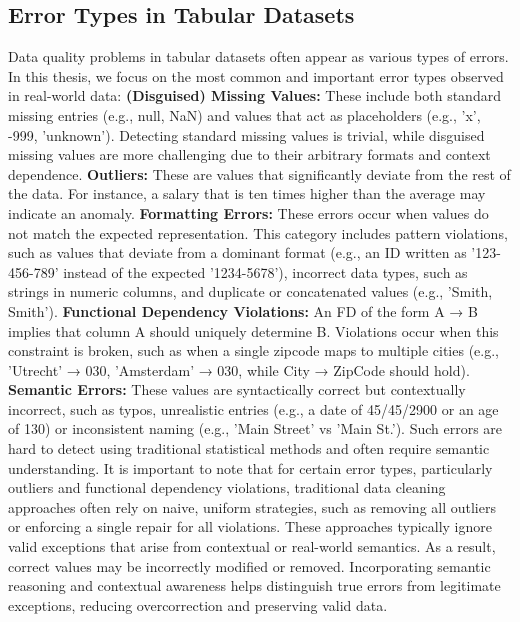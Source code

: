 \subsection{Error Types in Tabular Datasets}
Data quality problems in tabular datasets often appear as various types of errors. 
In this thesis, we focus on the most common and important error types observed in real-world data:
\newline\newline
\textbf{(Disguised) Missing Values:} These include both standard missing entries (e.g., null, NaN) and values that act as placeholders (e.g., 'x', -999, 'unknown'). 
Detecting standard missing values is trivial, while disguised missing values are more challenging due to their arbitrary formats and context dependence. 
\newline
\textbf{Outliers:} These are values that significantly deviate from the rest of the data. 
For instance, a salary that is ten times higher than the average may indicate an anomaly. 
\newline
\textbf{Formatting Errors:} These errors occur when values do not match the expected representation.
This category includes pattern violations, such as values that deviate from a dominant format (e.g., an ID written as '123-456-789' instead of the expected '1234-5678'), incorrect data types, such as strings in numeric columns, and duplicate or concatenated values (e.g., 'Smith, Smith').
\newline
\textbf{Functional Dependency Violations:} An FD of the form A → B implies that column A should uniquely determine B. 
Violations occur when this constraint is broken, such as when a single zipcode maps to multiple cities (e.g., 'Utrecht' → 030, 'Amsterdam' → 030, while City → ZipCode should hold).
\newline
\textbf{Semantic Errors:} These values are syntactically correct but contextually incorrect, such as typos, unrealistic entries (e.g., a date of 45/45/2900 or an age of 130) or inconsistent naming (e.g., 'Main Street' vs 'Main St.'). 
Such errors are hard to detect using traditional statistical methods and often require semantic understanding.
\newline\newline
It is important to note that for certain error types, particularly outliers and functional dependency violations, traditional data cleaning approaches often rely on naive, uniform strategies, such as removing all outliers or enforcing a single repair for all violations.  
These approaches typically ignore valid exceptions that arise from contextual or real-world semantics. 
As a result, correct values may be incorrectly modified or removed.
Incorporating semantic reasoning and contextual awareness helps distinguish true errors from legitimate exceptions, reducing overcorrection and preserving valid data.

